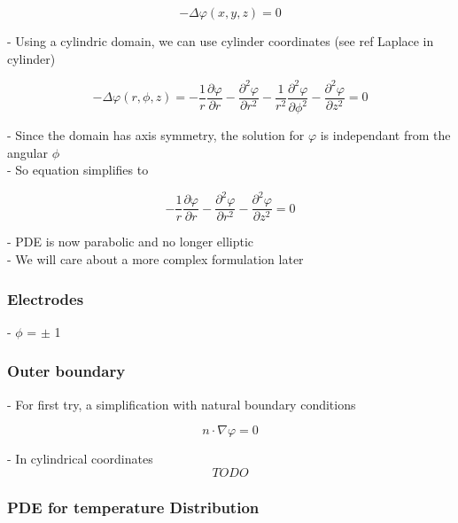 \documentclass[parskip=half, titlepage=yes, 12pt, BCOR=12mm, DIV=calc]{scrartcl}
\begin{document}
\begin{equation}
    - \Delta \varphi(x,y,z) = 0
\end{equation}

- Using a cylindric domain, we can use cylinder coordinates (see ref Laplace in cylinder)

\begin{equation}
    - \Delta \varphi(r,\phi,z) = - \frac{1}{r} \frac{\partial \varphi}{\partial r} - \frac{\partial^2 \varphi}{\partial r^2} - \frac{1}{r^2} \frac{\partial^2 \varphi}{\partial \phi^2} -      \frac{\partial^2 \varphi}{\partial z^2}  = 0
\end{equation}

- Since the domain has axis symmetry, the solution for $\varphi$ is independant from the angular $\phi$ \\
- So equation simplifies to

\begin{equation}
    - \frac{1}{r} \frac{\partial \varphi}{\partial r} - \frac{\partial^2 \varphi}{\partial r^2} - \frac{\partial^2 \varphi}{\partial z^2} = 0
\end{equation}

- PDE is now parabolic and no longer elliptic \\
- We will care about a more complex formulation later 


\subsubsection{Electrodes}

- $\phi$ = $\pm$ 1

\subsubsection{Outer boundary}

- For first try, a simplification with natural boundary conditions

\begin{equation}
    n \cdot \nabla \varphi = 0
\end{equation}

- In cylindrical coordinates
\begin{equation}
    TODO
\end{equation}

\subsubsection{PDE for temperature Distribution}
\end{document}
